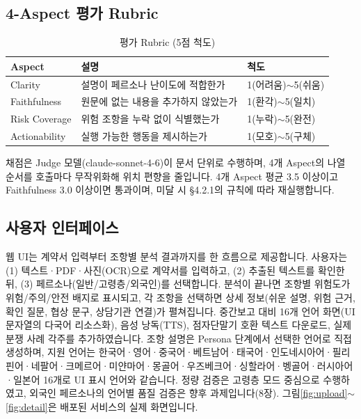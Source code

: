 \documentclass[10pt,a4paper]{article}
\newcommand{\tsz}{\fontsize{9.2}{12}\selectfont}
\begin{document}
\subsection{4-Aspect 평가 Rubric}
\begin{table}[!htbp]\centering\tsz
\caption{평가 Rubric (5점 척도)}\label{tab:rubric}
\begin{tabularx}{0.9\textwidth}{L{3.2cm} Y L{3.4cm}}
\toprule
\textbf{Aspect} & \textbf{설명} & \textbf{척도}\\
\midrule
Clarity & 설명이 페르소나 난이도에 적합한가 & 1(어려움)$\sim$5(쉬움)\\
Faithfulness & 원문에 없는 내용을 추가하지 않았는가 & 1(환각)$\sim$5(일치)\\
Risk Coverage & 위험 조항을 누락 없이 식별했는가 & 1(누락)$\sim$5(완전)\\
Actionability & 실행 가능한 행동을 제시하는가 & 1(모호)$\sim$5(구체)\\
\bottomrule
\end{tabularx}
\end{table}
채점은 Judge 모델(claude-sonnet-4-6)이 문서 단위로 수행하며, 4개 Aspect의 나열 순서를 호출마다 무작위화해 위치 편향을 줄입니다. 4개 Aspect 평균 3.5 이상이고 Faithfulness 3.0 이상이면 통과이며, 미달 시 \S4.2.1의 규칙에 따라 재실행합니다.

\subsection{사용자 인터페이스}
웹 UI는 계약서 입력부터 조항별 분석 결과까지를 한 흐름으로 제공합니다. 사용자는 (1) 텍스트·PDF·사진(OCR)으로 계약서를 입력하고, (2) 추출된 텍스트를 확인한 뒤, (3) 페르소나(일반/고령층/외국인)를 선택합니다. 분석이 끝나면 조항별 위험도가 위험/주의/안전 배지로 표시되고, 각 조항을 선택하면 상세 정보(쉬운 설명, 위험 근거, 확인 질문, 협상 문구, 상담기관 연결)가 펼쳐집니다. 중간보고 대비 16개 언어 화면(UI 문자열의 다국어 리소스화), 음성 낭독(TTS), 점자단말기 호환 텍스트 다운로드, 실제 분쟁 사례 각주를 추가하였습니다. 조항 설명은 Persona 단계에서 선택한 언어로 직접 생성하며, 지원 언어는 한국어·영어·중국어·베트남어·태국어·인도네시아어·필리핀어·네팔어·크메르어·미얀마어·몽골어·우즈베크어·싱할라어·벵골어·러시아어·일본어 16개로 UI 표시 언어와 같습니다. 정량 검증은 고령층 모드 중심으로 수행하였고, 외국인 페르소나의 언어별 품질 검증은 향후 과제입니다(8장). 그림\ref{fig:upload}$\sim$\ref{fig:detail}은 배포된 서비스의 실제 화면입니다.
\end{document}
